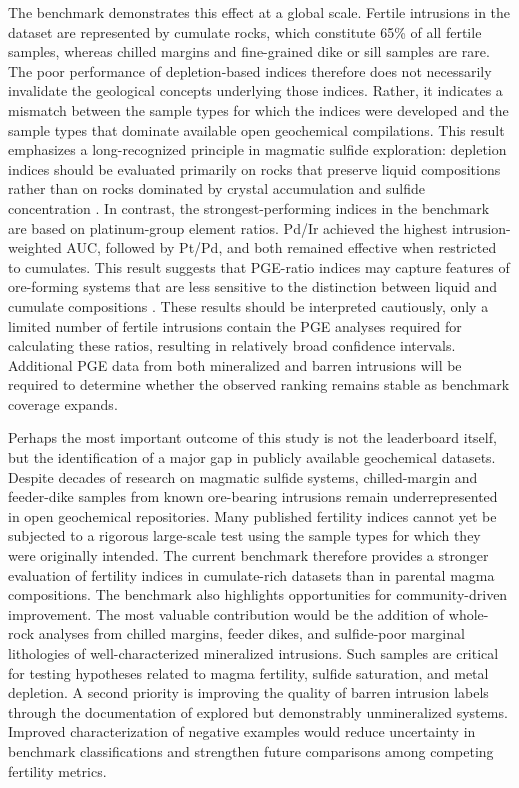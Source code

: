 \documentclass[10pt,twocolumn,letterpaper]{article}
\begin{document}
The benchmark demonstrates this effect at a global scale. Fertile intrusions in the dataset are represented by cumulate rocks, which constitute 65\% of all fertile samples, whereas chilled margins and fine-grained dike or sill samples are rare. The poor performance of depletion-based indices therefore does not necessarily invalidate the geological concepts underlying those indices. Rather, it indicates a mismatch between the sample types for which the indices were developed and the sample types that dominate available open geochemical compilations. This result emphasizes a long-recognized principle in magmatic sulfide exploration: depletion indices should be evaluated primarily on rocks that preserve liquid compositions rather than on rocks dominated by crystal accumulation and sulfide concentration \cite{barnes2023,barneswilliams2024}. In contrast, the strongest-performing indices in the benchmark are based on platinum-group element ratios. Pd/Ir achieved the highest intrusion-weighted AUC, followed by Pt/Pd, and both remained effective when restricted to cumulates. This result suggests that PGE-ratio indices may capture features of ore-forming systems that are less sensitive to the distinction between liquid and cumulate compositions \cite{barneswilliams2024,grondahlzajacz2022}. These results should be interpreted cautiously, only a limited number of fertile intrusions contain the PGE analyses required for calculating these ratios, resulting in relatively broad confidence intervals. Additional PGE data from both mineralized and barren intrusions will be required to determine whether the observed ranking remains stable as benchmark coverage expands.

Perhaps the most important outcome of this study is not the leaderboard itself, but the identification of a major gap in publicly available geochemical datasets. Despite decades of research on magmatic sulfide systems, chilled-margin and feeder-dike samples from known ore-bearing intrusions remain underrepresented in open geochemical repositories. Many published fertility indices cannot yet be subjected to a rigorous large-scale test using the sample types for which they were originally intended. The current benchmark therefore provides a stronger evaluation of fertility indices in cumulate-rich datasets than in parental magma compositions. The benchmark also highlights opportunities for community-driven improvement. The most valuable contribution would be the addition of whole-rock analyses from chilled margins, feeder dikes, and sulfide-poor marginal lithologies of well-characterized mineralized intrusions. Such samples are critical for testing hypotheses related to magma fertility, sulfide saturation, and metal depletion. A second priority is improving the quality of barren intrusion labels through the documentation of explored but demonstrably unmineralized systems. Improved characterization of negative examples would reduce uncertainty in benchmark classifications and strengthen future comparisons among competing fertility metrics.
\end{document}
